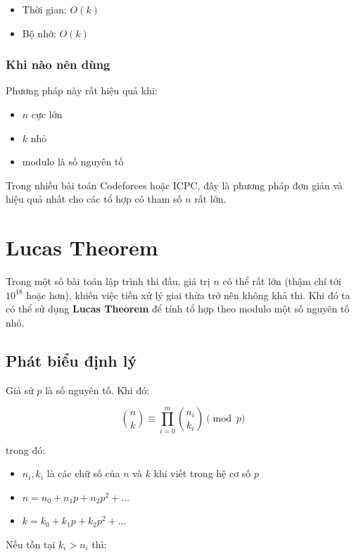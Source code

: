 \begin{itemize}
\item Thời gian: $O(k)$
\item Bộ nhớ: $O(k)$
\end{itemize}

\subsubsection*{Khi nào nên dùng}

Phương pháp này rất hiệu quả khi:

\begin{itemize}
\item $n$ cực lớn
\item $k$ nhỏ
\item modulo là số nguyên tố
\end{itemize}

Trong nhiều bài toán Codeforces hoặc ICPC, đây là phương pháp đơn giản và hiệu quả nhất cho các tổ hợp có tham số $n$ rất lớn.

\newpage

\section{Lucas Theorem}

Trong một số bài toán lập trình thi đấu, giá trị $n$ có thể rất lớn (thậm chí tới $10^{18}$ hoặc hơn), khiến việc tiền xử lý giai thừa trở nên không khả thi. Khi đó ta có thể sử dụng \textbf{Lucas Theorem} để tính tổ hợp theo modulo một số nguyên tố nhỏ.

\subsection*{Phát biểu định lý}

Giả sử $p$ là số nguyên tố. Khi đó:

\[
\binom{n}{k}
\equiv
\prod_{i=0}^{m}
\binom{n_i}{k_i}
\pmod p
\]

trong đó:

\begin{itemize}
\item $n_i, k_i$ là các chữ số của $n$ và $k$ khi viết trong hệ cơ số $p$
\item $n = n_0 + n_1 p + n_2 p^2 + \dots$
\item $k = k_0 + k_1 p + k_2 p^2 + \dots$
\end{itemize}

Nếu tồn tại $k_i > n_i$ thì:

